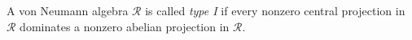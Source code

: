 A von Neumann algebra $\mathcal{R}$ is called \emph{type I} if every nonzero central projection in $\mathcal{R}$ dominates a nonzero abelian projection in $\mathcal{R}$.
